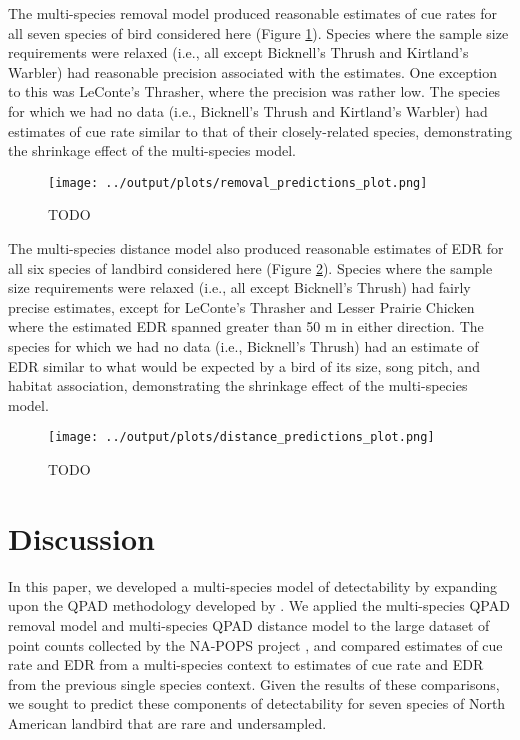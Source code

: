 \documentclass[12pt]{article}
\begin{document}
\par The multi-species removal model produced reasonable estimates of cue rates for all seven species of bird considered here (Figure \ref{fig:removal_predictions}).
Species where the sample size requirements were relaxed (i.e., all except Bicknell's Thrush and Kirtland's Warbler) had reasonable precision associated with the estimates.
One exception to this was LeConte's Thrasher, where the precision was rather low.
The species for which we had no data (i.e., Bicknell's Thrush and Kirtland's Warbler) had estimates of cue rate similar to that of their closely-related species, demonstrating the shrinkage effect of the multi-species model.

\begin{figure}[h!]
	\texttt{[image: ../output/plots/removal\_predictions\_plot.png]}
	\caption{TODO}
	\label{fig:removal_predictions}
\end{figure}

\par The multi-species distance model also produced reasonable estimates of EDR for all six species of landbird considered here (Figure \ref{fig:distance_predictions}).
Species where the sample size requirements were relaxed (i.e., all except Bicknell's Thrush) had fairly precise estimates, except for LeConte's Thrasher and Lesser Prairie Chicken where the estimated EDR spanned greater than 50 m in either direction.
The species for which we had no data (i.e., Bicknell's Thrush) had an estimate of EDR similar to what would be expected by a bird of its size, song pitch, and habitat association, demonstrating the shrinkage effect of the multi-species model.

\begin{figure}[h!]
	\texttt{[image: ../output/plots/distance\_predictions\_plot.png]}
	\caption{TODO}
	\label{fig:distance_predictions}
\end{figure}

\section{Discussion}

\par In this paper, we developed a multi-species model of detectability by expanding upon the QPAD methodology developed by \citet{solymos_calibrating_2013}.
We applied the multi-species QPAD removal model and multi-species QPAD distance model to the large dataset of point counts collected by the NA-POPS project \citep{edwards_point_2023}, and compared estimates of cue rate and EDR from a multi-species context to estimates of cue rate and EDR from the previous single species context.
Given the results of these comparisons, we sought to predict these components of detectability for seven species of North American landbird that are rare and undersampled.
\end{document}
